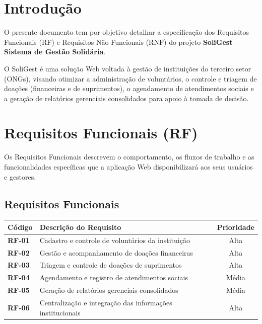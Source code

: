 \documentclass[
    12pt,               %
    a4paper,            %
    oneside,
    brazil              %
]{abntex2}
\begin{document}
\imprimircapa
\clearpage

\tableofcontents*
\clearpage

\chapter{Introdução}

O presente documento tem por objetivo detalhar a especificação dos Requisitos Funcionais (RF) e Requisitos Não Funcionais (RNF) do projeto \textbf{SoliGest -- Sistema de Gestão Solidária}.

O SoliGest é uma solução Web voltada à gestão de instituições do terceiro setor (ONGs), visando otimizar a administração de voluntários, o controle e triagem de doações (financeiras e de suprimentos), o agendamento de atendimentos sociais e a geração de relatórios gerenciais consolidados para apoio à tomada de decisão.

\chapter{Requisitos Funcionais (RF)}

Os Requisitos Funcionais descrevem o comportamento, os fluxos de trabalho e as funcionalidades específicas que a aplicação Web disponibilizará aos seus usuários e gestores.

\section{Requisitos Funcionais}

\begin{tabularx}{\textwidth}{l X c}
\toprule
\textbf{Código} & \textbf{Descrição do Requisito} & \textbf{Prioridade} \\
\midrule
\textbf{RF-01} & Cadastro e controle de voluntários da instituição & Alta \\
\textbf{RF-02} & Gestão e acompanhamento de doações financeiras & Alta \\
\textbf{RF-03} & Triagem e controle de doações de suprimentos & Alta \\
\textbf{RF-04} & Agendamento e registro de atendimentos sociais & Média \\
\textbf{RF-05} & Geração de relatórios gerenciais consolidados & Média \\
\textbf{RF-06} & Centralização e integração das informações institucionais & Alta \\
\bottomrule
\end{tabularx}
\end{document}
